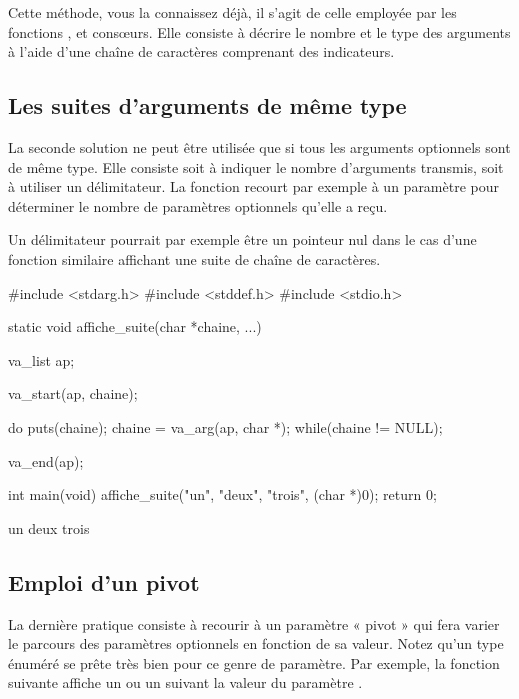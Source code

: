 Cette méthode, vous la connaissez déjà, il s'agit de celle employée par
les fonctions ,  et consœurs. Elle
consiste à décrire le nombre et le type des arguments à l'aide d'une
chaîne de caractères comprenant des indicateurs.

\subsection{Les suites d'arguments de même type}
\label{les-suites-darguments-de-meme-type}

La seconde solution ne peut être utilisée que si tous les arguments
optionnels sont de même type. Elle consiste soit à indiquer le nombre
d'arguments transmis, soit à utiliser un délimitateur. La fonction
 recourt par exemple à un paramètre pour
déterminer le nombre de paramètres optionnels qu'elle a reçu.

Un délimitateur pourrait par exemple être un pointeur nul dans le cas
d'une fonction similaire affichant une suite de chaîne de caractères.

\begin{C}
#include <stdarg.h>
#include <stddef.h>
#include <stdio.h>


static void affiche_suite(char *chaine, ...)
{
    va_list ap;

    va_start(ap, chaine);

    do
    {
        puts(chaine);
        chaine = va_arg(ap, char *);
    } while(chaine != NULL);

    va_end(ap);
}


int main(void)
{
    affiche_suite("un", "deux", "trois", (char *)0);
    return 0;
}
\end{C}

\begin{C}
un
deux
trois
\end{C}

\subsection{Emploi d'un pivot}
\label{emploi-dun-pivot}

La dernière pratique consiste à recourir à un paramètre « pivot » qui
fera varier le parcours des paramètres optionnels en fonction de sa
valeur. Notez qu'un type énuméré se prête très bien pour ce genre de
paramètre. Par exemple, la fonction suivante affiche un  ou
un  suivant la valeur du paramètre .

